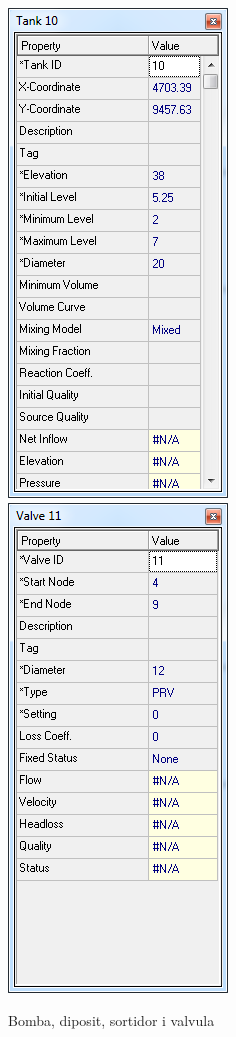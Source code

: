 \documentclass[12pt]{article}
\begin{document}
\begin{figure}[h!]
	\includegraphics[scale=0.35]{imatges/epanet/car/sortidor.png}
	\includegraphics[scale=0.35]{imatges/epanet/car/valvula.png}
	\caption{Bomba, diposit, sortidor i valvula}
\end{figure}
\end{document}
